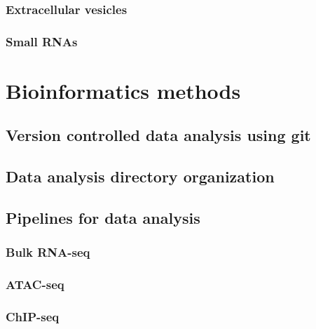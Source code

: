 \documentclass[12pt,twoside]{reedthesis}
\begin{document}
\hypertarget{extracellular-vesicles}{%
\subsection{Extracellular vesicles}\label{extracellular-vesicles}}

\hypertarget{small-rnas}{%
\subsection{Small RNAs}\label{small-rnas}}

\hypertarget{methods}{%
\chapter*{Bioinformatics methods}\label{methods}}

\hypertarget{version-controlled-data-analysis-using-git}{%
\section{Version controlled data analysis using git}\label{version-controlled-data-analysis-using-git}}

\hypertarget{data-analysis-directory-organization}{%
\section{Data analysis directory organization}\label{data-analysis-directory-organization}}

\hypertarget{pipelines-for-data-analysis}{%
\section{Pipelines for data analysis}\label{pipelines-for-data-analysis}}

\hypertarget{bulk-rna-seq}{%
\subsection{Bulk RNA-seq}\label{bulk-rna-seq}}

\hypertarget{atac-seq}{%
\subsection{ATAC-seq}\label{atac-seq}}

\hypertarget{chip-seq}{%
\subsection{ChIP-seq}\label{chip-seq}}
\end{document}

